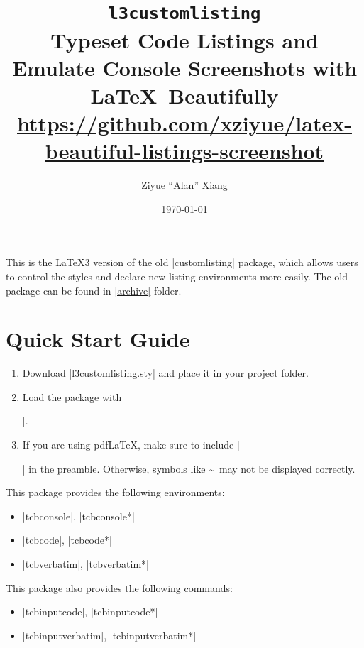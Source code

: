 \documentclass[letterpaper, 11pt, DIV=11]{scrartcl}
\author{\href{https://www.alanshawn.com}{Ziyue ``Alan'' Xiang}}
\title{\texttt{l3customlisting}\\Typeset Code Listings and Emulate Console Screenshots with \LaTeX\  Beautifully\\ {\small \url{https://github.com/xziyue/latex-beautiful-listings-screenshot}}}
\date{\today}
\begin{document}

\maketitle

\tableofcontents

\clearpage


This is the \LaTeX 3 version of the old \rawinline|customlisting| package, which allows users to control the styles and declare new listing environments more easily. The old package can be found in \href{https://github.com/xziyue/latex-beautiful-listings-screenshot/tree/master/archive}{\rawinline|archive|} folder.

\section{Quick Start Guide}

\begin{enumerate}
\item Download \href{https://github.com/xziyue/latex-beautiful-listings-screenshot/blob/master/l3customlisting.sty}{\rawinline|l3customlisting.sty|} and place it in your project folder.
\item Load the package with \texinline|\usepackage{l3customlisting}|.
\item If you are using pdf\LaTeX, make sure to include \texinline|\usepackage[T1]{fontenc}| in the preamble. Otherwise, symbols like \textasciitilde\ may not be displayed correctly.
\end{enumerate}

This package provides the following environments:
\begin{itemize}
\item \rawinline|tcbconsole|, \rawinline|tcbconsole*|
\item \rawinline|tcbcode|, \rawinline|tcbcode*|
\item \rawinline|tcbverbatim|, \rawinline|tcbverbatim*|
\end{itemize}

This package also provides the following commands:
\begin{itemize}
\item \rawinline|tcbinputcode|, \rawinline|tcbinputcode*|
\item \rawinline|tcbinputverbatim|, \rawinline|tcbinputverbatim*|
\end{itemize}
\end{document}
